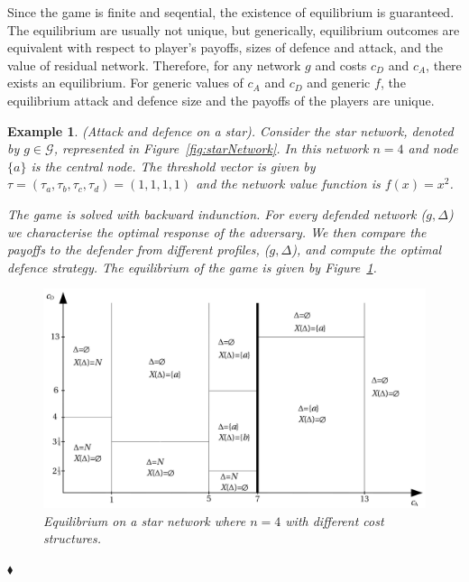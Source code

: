 \documentclass[11pt,fleqn]{article}
\newtheorem{expl}[theorem]{Example}
\newenvironment{example}{\begin{expl} \rm}{\hfill $\blacklozenge$ \end{expl}}{}
\begin{document}
Since the game is finite and seqential, the existence of equilibrium is guaranteed. The equilibrium are usually not unique, but generically, equilibrium outcomes are equivalent with respect to player's payoffs, sizes of defence and attack, and the value of residual network. Therefore, for any network $g$ and costs $c_{D}$ and $c_{A}$, there exists an equilibrium. For generic values of $c_{A}$ and $c_{D}$ and generic $f$, the equilibrium attack and defence size and the payoffs of the players are unique.


\begin{example} 
\label{ex:starAttack} 
(Attack and defence on a star).
Consider the star network, denoted by $g \in \mathcal{G}$, represented in Figure~\ref{fig:starNetwork}. In this network $n = 4$ and node $\{ a \}$ is the central node. The threshold vector is given by $\tau = (\tau_{a}, \tau_{b}, \tau_{c}, \tau_{d}) = (1, 1, 1, 1)$ and the network value function is $f(x) = x^{2}$.

The game is solved with backward indunction. For every defended network ($g, \Delta$) we characterise the optimal response of the adversary. We then compare the payoffs to the defender from different profiles, ($g, \Delta$), and compute the optimal defence strategy. The equilibrium of the game is given by Figure~\ref{basicStarEquilibrium}.
\begin{figure}[ht]
\begin{center}
\includegraphics[scale = 0.25]{images/star-game-equilibrium}
\caption{Equilibrium on a star network where $n = 4$ with different cost structures.}
\label{basicStarEquilibrium}
\end{center}
\end{figure}
\end{example}
\end{document}
